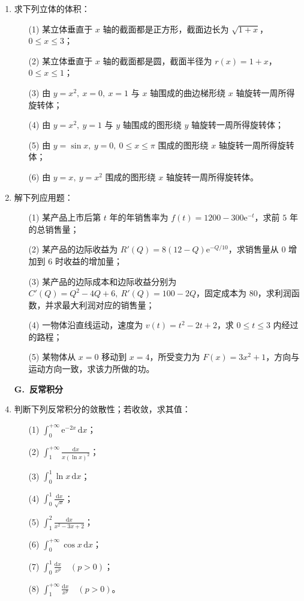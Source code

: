 \documentclass[fontset=fandol]{ctexart}
\newcommand{\dd}{\mathrm{d}}
\newcommand{\ee}{\mathrm{e}}
\begin{document}
\begin{enumerate}
\item 求下列立体的体积：
\begin{enumerate}
\item[(1)] 某立体垂直于 $x$ 轴的截面都是正方形，截面边长为 $\sqrt{1+x}$，$0\leq x\leq3$；
\item[(2)] 某立体垂直于 $x$ 轴的截面都是圆，截面半径为 $r(x)=1+x$，$0\leq x\leq1$；
\item[(3)] 由 $y=x^2,\ x=0,\ x=1$ 与 $x$ 轴围成的曲边梯形绕 $x$ 轴旋转一周所得旋转体；
\item[(4)] 由 $y=x^2,\ y=1$ 与 $y$ 轴围成的图形绕 $y$ 轴旋转一周所得旋转体；
\item[(5)] 由 $y=\sin x,\ y=0,\ 0\leq x\leq\pi$ 围成的图形绕 $x$ 轴旋转一周所得旋转体；
\item[(6)] 由 $y=x,\ y=x^2$ 围成的图形绕 $x$ 轴旋转一周所得旋转体。
\end{enumerate}

\item 解下列应用题：
\begin{enumerate}
\item[(1)] 某产品上市后第 $t$ 年的年销售率为 $f(t)=1200-300\ee^{-t}$，求前 $5$ 年的总销售量；
\item[(2)] 某产品的边际收益为 $R'(Q)=8(12-Q)\ee^{-Q/10}$，求销售量从 $0$ 增加到 $6$ 时收益的增加量；
\item[(3)] 某产品的边际成本和边际收益分别为 $C'(Q)=Q^2-4Q+6,\ R'(Q)=100-2Q$，固定成本为 $80$，求利润函数，并求最大利润对应的销售量；
\item[(4)] 一物体沿直线运动，速度为 $v(t)=t^2-2t+2$，求 $0\leq t\leq3$ 内经过的路程；
\item[(5)] 某物体从 $x=0$ 移动到 $x=4$，所受变力为 $F(x)=3x^2+1$，方向与运动方向一致，求该力所做的功。
\end{enumerate}

\item[]\textbf{G.\ 反常积分}
\setcounter{enumi}{0}
\item 判断下列反常积分的敛散性；若收敛，求其值：
\begin{enumerate}
\item[(1)] $\displaystyle \int_0^{+\infty}\ee^{-2x}\,\dd x$；
\item[(2)] $\displaystyle \int_1^{+\infty}\frac{\dd x}{x(\ln x)^2}$；
\item[(3)] $\displaystyle \int_0^1\ln x\,\dd x$；
\item[(4)] $\displaystyle \int_0^1\frac{\dd x}{\sqrt{x}}$；
\item[(5)] $\displaystyle \int_1^2\frac{\dd x}{x^2-3x+2}$；
\item[(6)] $\displaystyle \int_0^{+\infty}\cos x\,\dd x$；
\item[(7)] $\displaystyle \int_0^1\frac{\dd x}{x^p}\quad(p>0)$；
\item[(8)] $\displaystyle \int_1^{+\infty}\frac{\dd x}{x^p}\quad(p>0)$。
\end{enumerate}


\end{enumerate}
\end{document}
